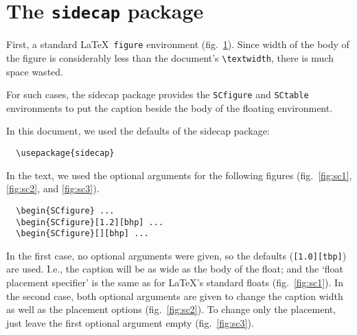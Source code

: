 \documentclass[12pt,a4paper]{article}
\begin{document}
\section*{The \texttt{sidecap} package}

First, a standard \LaTeX\ \texttt{figure} environment
(fig.~\ref{fig:standard}).
Since width of the body of the figure is considerably less than
the document's \verb|\textwidth|, there is much space wasted.

\begin{figure}[h]
  \centering
  \caption[\SHORTCAPi]{\CAPi}
  \label{fig:standard}
\end{figure}

For such cases, the \textsf{sidecap} package provides the
\verb|SCfigure| and \verb|SCtable| environments to put the
caption beside the body of the floating environment.

In this document, we used the defaults of the \textsf{sidecap} package:
%
\begin{verbatim}
  \usepackage{sidecap}
\end{verbatim}
%
In the text, we used the optional arguments for the following figures
(fig.~\ref{fig:sc1}, \ref{fig:sc2}, and \ref{fig:sc3}).
%
\begin{verbatim}
  \begin{SCfigure} ...
  \begin{SCfigure}[1.2][bhp] ...
  \begin{SCfigure}[][bhp] ...
\end{verbatim}
%
In the first case, no optional arguments were given, so the defaults
(\verb|[1.0][tbp]|) are used. I.e., the caption will be as wide as
the body of the float; and the `float placement specifier' is the same
as for \LaTeX's standard floats (fig.~\ref{fig:sc1}).
In the second case, both optional arguments are given to change the
caption width as well as the placement options (fig.~\ref{fig:sc2}).
To change only the placement, just leave the first optional argument
empty (fig.~\ref{fig:sc3}).

\begin{SCfigure}
  \caption[\SHORTCAPi]{\CAPi}
  \label{fig:sc1}
\end{SCfigure}

\begin{SCfigure}[1.2][bhp]
  \caption[\SHORTCAPi]{\CAPi}
  \label{fig:sc2}
\end{SCfigure}

\begin{SCfigure}[][bhp]
  \caption[\SHORTCAPi]{\CAPi}
  \label{fig:sc3}
\end{SCfigure}
\end{document}
